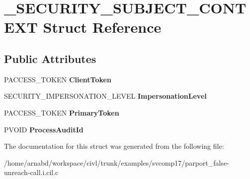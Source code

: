 \hypertarget{struct__SECURITY__SUBJECT__CONTEXT}{}\section{\+\_\+\+S\+E\+C\+U\+R\+I\+T\+Y\+\_\+\+S\+U\+B\+J\+E\+C\+T\+\_\+\+C\+O\+N\+T\+E\+X\+T Struct Reference}
\label{struct__SECURITY__SUBJECT__CONTEXT}
\subsection*{Public Attributes}
\begin{DoxyCompactItemize}
\item 
\hypertarget{struct__SECURITY__SUBJECT__CONTEXT_a53a0eb5729d32300ec7a01a431bd9781}{}P\+A\+C\+C\+E\+S\+S\+\_\+\+T\+O\+K\+E\+N {\bfseries Client\+Token}\label{struct__SECURITY__SUBJECT__CONTEXT_a53a0eb5729d32300ec7a01a431bd9781}

\item 
\hypertarget{struct__SECURITY__SUBJECT__CONTEXT_a3497d9db7ed5b142f2763cc8a54a451f}{}S\+E\+C\+U\+R\+I\+T\+Y\+\_\+\+I\+M\+P\+E\+R\+S\+O\+N\+A\+T\+I\+O\+N\+\_\+\+L\+E\+V\+E\+L {\bfseries Impersonation\+Level}\label{struct__SECURITY__SUBJECT__CONTEXT_a3497d9db7ed5b142f2763cc8a54a451f}

\item 
\hypertarget{struct__SECURITY__SUBJECT__CONTEXT_a7d2cf3f100cb0575a3aa22c8cd7f28b2}{}P\+A\+C\+C\+E\+S\+S\+\_\+\+T\+O\+K\+E\+N {\bfseries Primary\+Token}\label{struct__SECURITY__SUBJECT__CONTEXT_a7d2cf3f100cb0575a3aa22c8cd7f28b2}

\item 
\hypertarget{struct__SECURITY__SUBJECT__CONTEXT_af71292a76ec75ebc4ab5c369f1d7c61c}{}P\+V\+O\+I\+D {\bfseries Process\+Audit\+Id}\label{struct__SECURITY__SUBJECT__CONTEXT_af71292a76ec75ebc4ab5c369f1d7c61c}

\end{DoxyCompactItemize}


The documentation for this struct was generated from the following file\+:\begin{DoxyCompactItemize}
\item 
/home/arnabd/workspace/civl/trunk/examples/svcomp17/parport\+\_\+false-\/unreach-\/call.\+i.\+cil.\+c\end{DoxyCompactItemize}
